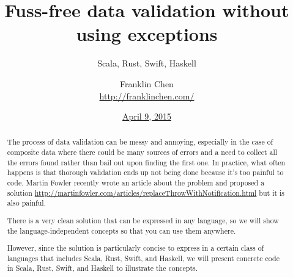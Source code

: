 {
}

\usepackage[utf8]{inputenc}
\usepackage{booktabs}

\usepackage{minted}

\title[Fuss-free data validation]{Fuss-free data validation without
  using exceptions}
\subtitle{Scala, Rust, Swift, Haskell}
\author{Franklin Chen \\ \url{http://franklinchen.com/}}
\date[April 9, 2015]{\href{http://www.meetup.com/Pittsburgh-Code-Supply/events/221130516/}{April 9, 2015}}

\subject{Talks}




\maketitle

\begin{abstract}
The process of data validation can be messy and annoying, especially in the case of composite data where there could be many sources of errors and a need to collect all the errors found rather than bail out upon finding the first one. In practice, what often happens is that thorough validation ends up not being done because it's too painful to code. Martin Fowler recently wrote an article about the problem and proposed a solution \url{http://martinfowler.com/articles/replaceThrowWithNotification.html} but it is also painful.

There is a very clean solution that can be expressed in any language, so we will show the language-independent concepts so that you can use them anywhere.

However, since the solution is particularly concise to express in a certain class of languages that includes Scala, Rust, Swift, and Haskell, we will present concrete code in Scala, Rust, Swift, and Haskell to illustrate the concepts.
\end{abstract}

\begin{frame}
  \titlepage{}
\end{frame}

